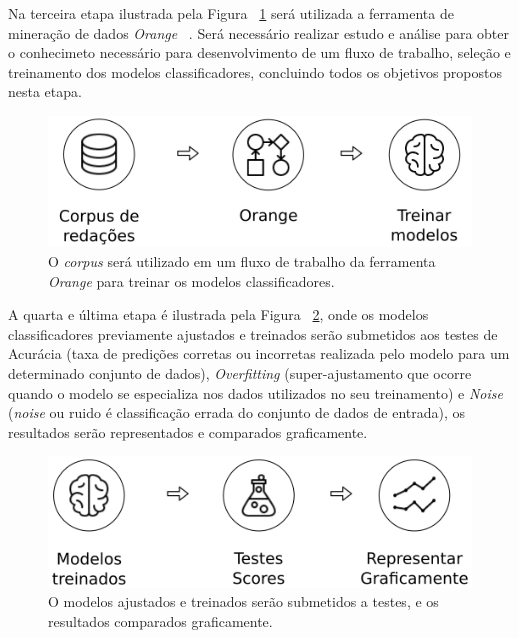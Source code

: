 Na terceira etapa ilustrada pela Figura ~\ref{fig:metodologia_3} será utilizada a ferramenta de mineração de dados \textit{Orange} ~\cite{orange_3:2017}. Será necessário realizar estudo e análise para obter o conhecimeto necessário para desenvolvimento de um fluxo de trabalho, seleção e treinamento dos modelos classificadores, concluindo todos os objetivos propostos nesta etapa.

\begin{figure}[H]
\begin{center}
    \includegraphics[scale=0.75]{figuras/metodologia_3.png}
\end{center}
\caption{O \textit{corpus} será utilizado em um fluxo de trabalho da ferramenta \textit{Orange} para treinar os modelos classificadores.}
\label{fig:metodologia_3}
\end{figure}

A quarta e última etapa é ilustrada pela Figura ~\ref{fig:metodologia_4}, onde os modelos classificadores previamente ajustados e treinados serão submetidos aos testes de Acurácia (taxa de predições corretas ou incorretas realizada pelo modelo para um determinado conjunto de dados), \textit{Overfitting} (super-ajustamento que ocorre quando o modelo se especializa nos dados utilizados no seu treinamento) e \textit{Noise} (\textit{noise} ou ruido é classificação errada do conjunto de dados de entrada), os resultados serão representados e comparados graficamente.
\begin{figure}[H]
\begin{center}
    \includegraphics[scale=0.75]{figuras/metodologia_4.png}
\end{center}
\caption{O modelos ajustados e treinados serão submetidos a testes, e os resultados comparados graficamente.}
\label{fig:metodologia_4}
\end{figure}
